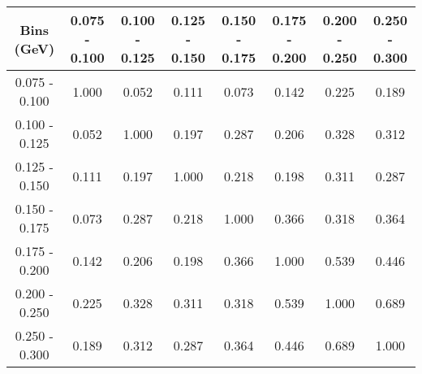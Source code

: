 \documentclass[aps, prd, reprint,showpacs,  preprintnumbers,amsmath,amssymb,superscriptaddress, nofootinbib]{revtex4-1}
\makeatletter
\renewenvironment{table}
  {\def\@captype{table}}
  {}
\makeatother
\begin{document}
\begin{table}
\centering
\begin{tabular}{cccccccc}
\hline
    Bins (GeV) &  0.075 - 0.100 &  0.100 - 0.125 &  0.125 - 0.150 &  0.150 - 0.175 &  0.175 - 0.200 &  0.200 - 0.250 &  0.250 - 0.300 \\ 
\hline
0.075 - 0.100  & 1.000  & 0.052  & 0.111  & 0.073  & 0.142  & 0.225  & 0.189 \\
0.100 - 0.125  & 0.052  & 1.000  & 0.197  & 0.287  & 0.206  & 0.328  & 0.312 \\
0.125 - 0.150  & 0.111  & 0.197  & 1.000  & 0.218  & 0.198  & 0.311  & 0.287 \\
0.150 - 0.175  & 0.073  & 0.287  & 0.218  & 1.000  & 0.366  & 0.318  & 0.364 \\
0.175 - 0.200  & 0.142  & 0.206  & 0.198  & 0.366  & 1.000  & 0.539  & 0.446 \\
0.200 - 0.250  & 0.225  & 0.328  & 0.311  & 0.318  & 0.539  & 1.000  & 0.689 \\
0.250 - 0.300  & 0.189  & 0.312  & 0.287  & 0.364  & 0.446  & 0.689  & 1.000 \\
\hline
\hline
\end{tabular}
\caption{Correlation matrix for bins of $d\sigma/dT_\pi$.}
\label{tb:piz_kinetic_cov}
\end{table}

\vspace{0.7cm}
\end{document}
